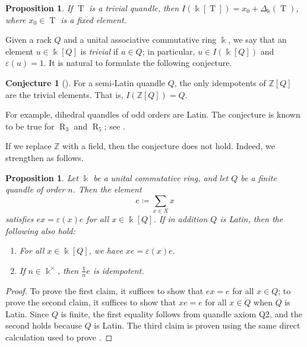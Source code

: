\documentclass[12 pt]{amsart}
\newtheorem{proposition}[theorem]{Proposition}
\theoremstyle{definition}
\newtheorem{conjecture}[theorem]{Conjecture}
\theoremstyle{remark}
\numberwithin{equation}{section}
\newcommand{\T}{\operatorname{T}}
\newcommand{\R}{\operatorname{R}}
\newcommand{\Z}{\mathbb{Z}}
\renewcommand{\epsilon}{\varepsilon}
\renewcommand{\k}{\Bbbk}
\begin{document}
\begin{proposition} \label{trivial-quandle-idempotents}
If $\T$ is a trivial quandle, then $ I(\k[\T]) =  x_0 + \Delta_\k (\T)$, where  $x_0 \in \T$ is a fixed element.
\end{proposition}

Given a rack $Q$ and a unital associative commutative ring $\k$, we say that an element $u\in\k[Q]$ is \emph{trivial} if $u\in Q$; in particular, $u\in I(\k[Q])$ and $\epsilon(u)=1$. It is natural to formulate the following conjecture.

 \begin{conjecture}[{\cite[Conj.\ 3.10]{MBMD}}]\label{conjid}    
For a semi-Latin quandle $Q$, the only idempotents of $\mathbb{Z}[Q]$ are the trivial elements. That is, $I(\Z[Q])=Q$.
\end{conjecture}

For example, dihedral quandles of odd orders are Latin. The conjecture is known to be true for $\R_3$ and $\R_5$; see \cite{MBMD}.

If we replace $\Z$ with a field, then the conjecture does not hold. 
Indeed, we strengthen \cite[Prop.\ 11.18]{BES} as follows.

\begin{proposition}\label{prop:unital}
    Let $\k$ be a unital commutative ring, and let $Q$ be a finite quandle of order $n$. Then the element
    \[
    e\coloneq \sum_{x\in X} x
    \]
    satisfies $ex=\epsilon(x)e$ for all $x\in \k[Q]$. If in addition $Q$ is Latin, then the following also hold:
    \begin{enumerate}
        \item For all $x\in\k[Q]$, we have $xe=\epsilon(x)e$.
        \item If $n\in\k^\times$, then $\frac{1}{n}e$ is idempotent.
    \end{enumerate}
\end{proposition}

\begin{proof}
    To prove the first claim, it suffices to show that $ex=e$ for all $x\in Q$; to prove the second claim, it suffices to show that $xe=e$ for all $x\in Q$ when $Q$ is Latin. Since $Q$ is finite, the first equality follows from quandle axiom Q2, and the second holds because $Q$ is Latin. The third claim is proven using the same direct calculation used to prove \cite[Prop.\ 11.18]{BES}.
\end{proof}
\end{document}
